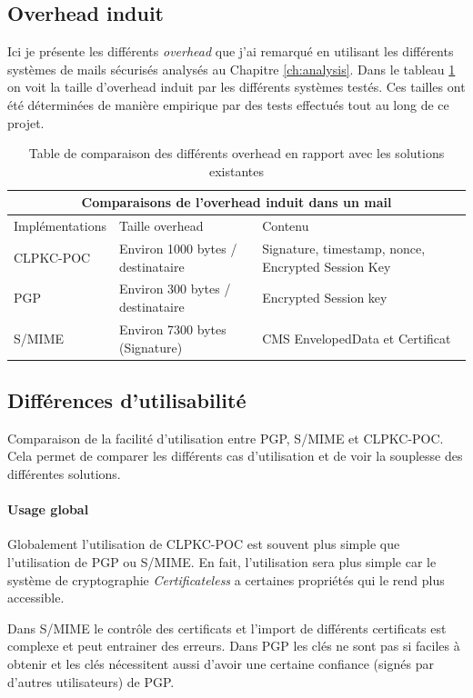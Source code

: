 \subsection{Overhead induit}
Ici je présente les différents \textit{overhead} que j'ai remarqué en utilisant les différents systèmes de mails sécurisés analysés au Chapitre \ref{ch:analysis}. Dans le tableau \ref{table:comparisonOverhead} on voit la taille d'overhead induit par les différents systèmes testés. Ces tailles ont été déterminées de manière empirique par des tests effectués tout au long de ce projet.
\begin{table}[h!]
	\centering
	\begin{tabular}{ |p{3cm}||p{4cm}|p{6cm}| }
		\hline
		\multicolumn{3}{|c|}{Comparaisons de l'overhead induit dans un mail} \\
		\hline
		Implémentations & Taille overhead & Contenu\\
		\hline
		CLPKC-POC   & Environ 1000 bytes / destinataire & Signature, timestamp, nonce, Encrypted Session Key\\
		PGP & Environ 300 bytes / destinataire & Encrypted Session key\\
		S/MIME & Environ 7300 bytes (Signature) & CMS EnvelopedData et Certificat\\
		\hline
	\end{tabular}
	\caption{Table de comparaison des différents overhead en rapport avec les solutions existantes }
	\label{table:comparisonOverhead}
\end{table}

\subsection{Différences d'utilisabilité}
Comparaison de la facilité d'utilisation entre PGP, S/MIME et CLPKC-POC. Cela permet de comparer les différents cas d'utilisation et de voir la souplesse des différentes solutions.

\paragraph*{Usage global}
Globalement l'utilisation de CLPKC-POC est souvent plus simple que l'utilisation de PGP ou S/MIME. En fait, l'utilisation sera plus simple car le système de cryptographie \textit{Certificateless} a certaines propriétés qui le rend plus accessible. 

Dans S/MIME le contrôle des certificats et l'import de différents certificats est complexe et peut entrainer des erreurs. Dans PGP les clés ne sont pas si faciles à obtenir et les clés nécessitent aussi d'avoir une certaine confiance (signés par d'autres utilisateurs) de PGP.
